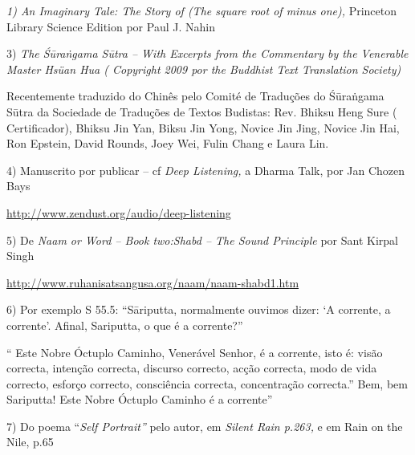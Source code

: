 \printpagenotes*

\emph{1) An Imaginary Tale: The Story of (The square root of minus
one),} Princeton Library Science Edition por Paul J. Nahin

3) \emph{The Śūraṅgama Sūtra -- With Excerpts from the Commentary by the
Venerable Master Hsüan Hua ( Copyright 2009 por the Buddhist Text
Translation Society)}

Recentemente traduzido do Chinês pelo Comité de Traduções do Śūraṅgama
Sūtra da Sociedade de Traduções de Textos Budistas: Rev. Bhiksu Heng
Sure ( Certificador), Bhiksu Jin Yan, Biksu Jin Yong, Novice Jin Jing,
Novice Jin Hai, Ron Epstein, David Rounds, Joey Wei, Fulin Chang e Laura
Lin.

4) Manuscrito por publicar -- cf \emph{Deep Listening,} a Dharma Talk,
por Jan Chozen Bays

\url{http://www.zendust.org/audio/deep-listening}

5) De \emph{Naam or Word -- Book two:Shabd -- The Sound Principle} por
Sant Kirpal Singh

\url{http://www.ruhanisatsangusa.org/naam/naam-shabd1.htm}

6) Por exemplo S 55.5: ``Sāriputta, normalmente ouvimos dizer: `A
corrente, a corrente'. Afinal, Sariputta, o que é a corrente?''

`` Este Nobre Óctuplo Caminho, Venerável Senhor, é a corrente, isto é:
visão correcta, intenção correcta, discurso correcto, acção correcta,
modo de vida correcto, esforço correcto, consciência correcta,
concentração correcta.'' Bem, bem Sariputta! Este Nobre Óctuplo Caminho
é a corrente''

7) Do poema ``\emph{Self Portrait''} pelo autor, em \emph{Silent Rain
p.263,} e em Rain on the Nile, p.65

